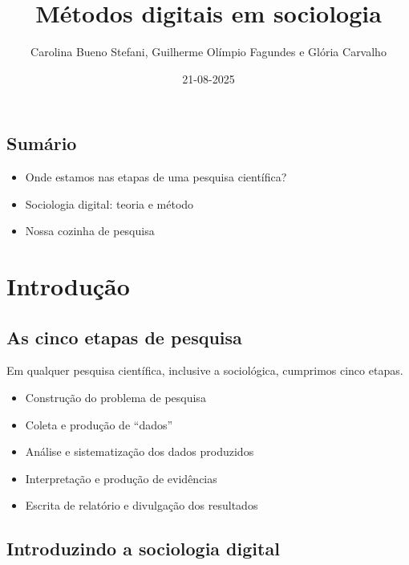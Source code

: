 \documentclass[
  brazilian,
  letterpaper,
  DIV=11,
  numbers=noendperiod]{scrartcl}
\title{Métodos digitais em sociologia}
\author{Carolina Bueno Stefani, Guilherme Olímpio Fagundes e Glória
Carvalho}
\date{21-08-2025}
\providecommand{\tightlist}{%
  \setlength{\itemsep}{0pt}\setlength{\parskip}{0pt}}
\begin{document}
\maketitle


\subsection{Sumário}\label{sumuxe1rio}

\begin{itemize}
\tightlist
\item
  Onde estamos nas etapas de uma pesquisa científica?
\item
  Sociologia digital: teoria e método
\item
  Nossa cozinha de pesquisa
\end{itemize}

\section{Introdução}\label{introduuxe7uxe3o}

\subsection{As cinco etapas de
pesquisa}\label{as-cinco-etapas-de-pesquisa}

Em qualquer pesquisa científica, inclusive a sociológica, cumprimos
cinco etapas.

\begin{itemize}
\tightlist
\item
  Construção do problema de pesquisa
\end{itemize}

\begin{itemize}
\tightlist
\item
  Coleta e produção de ``dados''
\end{itemize}

\begin{itemize}
\tightlist
\item
  Análise e sistematização dos dados produzidos
\item
  Interpretação e produção de evidências
\item
  Escrita de relatório e divulgação dos resultados
\end{itemize}

\subsection{Introduzindo a sociologia
digital}\label{introduzindo-a-sociologia-digital}
\end{document}
